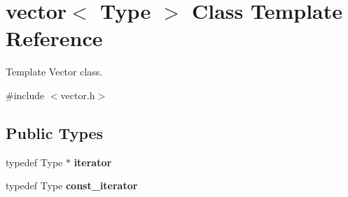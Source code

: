 \hypertarget{classvector}{}\section{vector$<$ Type $>$ Class Template Reference}
\label{classvector}


Template Vector class.  




{\ttfamily \#include $<$vector.\+h$>$}

\subsection*{Public Types}
\begin{DoxyCompactItemize}
\item 
\hypertarget{classvector_a0353117bdb832ae6616b6a068f8258da}{}\label{classvector_a0353117bdb832ae6616b6a068f8258da} 
typedef Type $\ast$ {\bfseries iterator}
\item 
\hypertarget{classvector_a574b95e8b5195d74bc6d1d9c530cf8b0}{}\label{classvector_a574b95e8b5195d74bc6d1d9c530cf8b0} 
typedef Type {\bfseries const\+\_\+iterator}
\end{DoxyCompactItemize}

